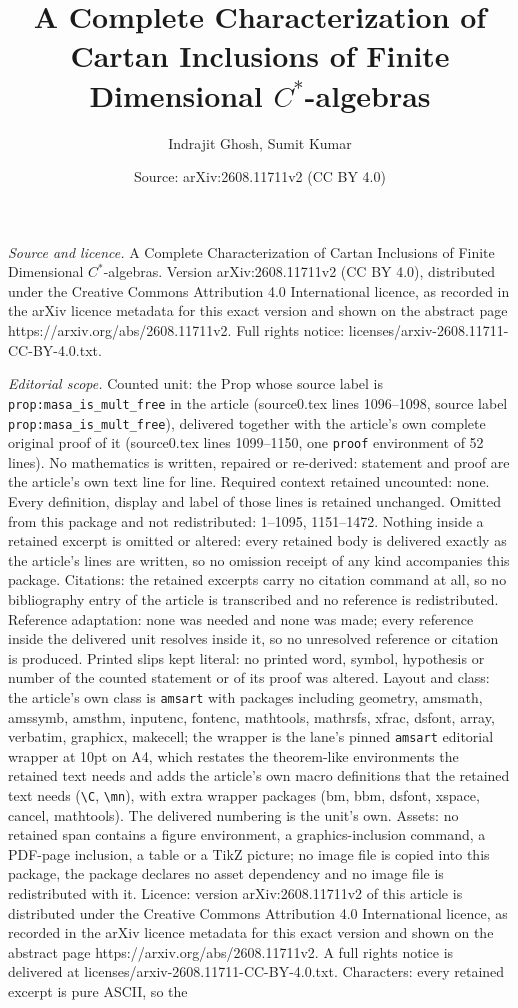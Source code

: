 \documentclass[10pt,a4paper]{amsart}
\title[A Complete Characterization of Cartan Inclusions of Finite D]{A Complete Characterization of Cartan Inclusions of Finite Dimensional $C^*$-algebras}
\author{Indrajit Ghosh, Sumit Kumar}
\date{Source: arXiv:2608.11711v2 (CC BY 4.0)}
\begin{document}
\maketitle

\noindent\emph{Source and licence.} A Complete Characterization of Cartan Inclusions of Finite Dimensional $C^*$-algebras. Version arXiv:2608.11711v2 (CC BY 4.0), distributed under the Creative Commons Attribution 4.0 International licence, as recorded in the arXiv licence metadata for this exact version and shown on the abstract page https://arxiv.org/abs/2608.11711v2. Full rights notice: licenses/arxiv-2608.11711-CC-BY-4.0.txt.\par\smallskip

\noindent\textit{Editorial scope.} Counted unit: the Prop whose source label is \texttt{prop:masa\_is\_mult\_free} in the article (source0.tex lines 1096--1098, source label \texttt{prop:masa\_is\_mult\_free}), delivered together with the article's own complete original proof of it (source0.tex lines 1099--1150, one \texttt{proof} environment of 52 lines). No mathematics is written, repaired or re-derived: statement and proof are the article's own text line for line. Required context retained uncounted: none. Every definition, display and label of those lines is retained unchanged. Omitted from this package and not redistributed: 1--1095, 1151--1472. Nothing inside a retained excerpt is omitted or altered: every retained body is delivered exactly as the article's lines are written, so no omission receipt of any kind accompanies this package. Citations: the retained excerpts carry no citation command at all, so no bibliography entry of the article is transcribed and no reference is redistributed. Reference adaptation: none was needed and none was made; every reference inside the delivered unit resolves inside it, so no unresolved reference or citation is produced. Printed slips kept literal: no printed word, symbol, hypothesis or number of the counted statement or of its proof was altered. Layout and class: the article's own class is \texttt{amsart} with packages including geometry, amsmath, amssymb, amsthm, inputenc, fontenc, mathtools, mathrsfs, xfrac, dsfont, array, verbatim, graphicx, makecell; the wrapper is the lane's pinned \texttt{amsart} editorial wrapper at 10pt on A4, which restates the theorem-like environments the retained text needs and adds the article's own macro definitions that the retained text needs (\texttt{\textbackslash C}, \texttt{\textbackslash mn}), with extra wrapper packages (bm, bbm, dsfont, xspace, cancel, mathtools). The delivered numbering is the unit's own. Assets: no retained span contains a figure environment, a graphics-inclusion command, a PDF-page inclusion, a table or a TikZ picture; no image file is copied into this package, the package declares no asset dependency and no image file is redistributed with it. Licence: version arXiv:2608.11711v2 of this article is distributed under the Creative Commons Attribution 4.0 International licence, as recorded in the arXiv licence metadata for this exact version and shown on the abstract page https://arxiv.org/abs/2608.11711v2. A full rights notice is delivered at licenses/arxiv-2608.11711-CC-BY-4.0.txt. Characters: every retained excerpt is pure ASCII, so the 
\end{document}
